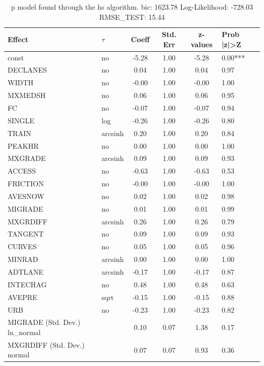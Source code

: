 \begin{table}
	\caption{p model found through the hs algorithm. bic: 1623.78 Log-Likelihood: -728.03 RMSE_TEST: 15.44}
	\begin{center}
		\begin{tabular}{|l|l|c|c|c|l|}
			\hline
			Effect & $\tau$ & Coeff & Std. Err & z-values & Prob |z|>Z \\
			\hline
			const & no & -5.28 & 1.00 & -5.28 & 0.00*** \\
			\hline
			DECLANES & no & 0.04 & 1.00 & 0.04 & 0.97 \\
			\hline
			WIDTH & no & -0.00 & 1.00 & -0.00 & 1.00 \\
			\hline
			MXMEDSH & no & 0.06 & 1.00 & 0.06 & 0.95 \\
			\hline
			FC & no & -0.07 & 1.00 & -0.07 & 0.94 \\
			\hline
			SINGLE & log & -0.26 & 1.00 & -0.26 & 0.80 \\
			\hline
			TRAIN & arcsinh & 0.20 & 1.00 & 0.20 & 0.84 \\
			\hline
			PEAKHR & no & 0.00 & 1.00 & 0.00 & 1.00 \\
			\hline
			MXGRADE & arcsinh & 0.09 & 1.00 & 0.09 & 0.93 \\
			\hline
			ACCESS & no & -0.63 & 1.00 & -0.63 & 0.53 \\
			\hline
			FRICTION & no & -0.00 & 1.00 & -0.00 & 1.00 \\
			\hline
			AVESNOW & no & 0.02 & 1.00 & 0.02 & 0.98 \\
			\hline
			MIGRADE & no & 0.01 & 1.00 & 0.01 & 0.99 \\
			\hline
			MXGRDIFF & arcsinh & 0.26 & 1.00 & 0.26 & 0.79 \\
			\hline
			TANGENT & no & 0.09 & 1.00 & 0.09 & 0.93 \\
			\hline
			CURVES & no & 0.05 & 1.00 & 0.05 & 0.96 \\
			\hline
			MINRAD & arcsinh & 0.00 & 1.00 & 0.00 & 1.00 \\
			\hline
			ADTLANE & arcsinh & -0.17 & 1.00 & -0.17 & 0.87 \\
			\hline
			INTECHAG & no & 0.48 & 1.00 & 0.48 & 0.63 \\
			\hline
			AVEPRE & sqrt & -0.15 & 1.00 & -0.15 & 0.88 \\
			\hline
			URB & no & -0.23 & 1.00 & -0.23 & 0.82 \\
			\hline
			MIGRADE (Std. Dev.) ln_normal &  & 0.10 & 0.07 & 1.38 & 0.17 \\
			\hline
			MXGRDIFF (Std. Dev.) normal &  & 0.07 & 0.07 & 0.93 & 0.36 \\

\end{tabular}
\end{center}
\end{table}
